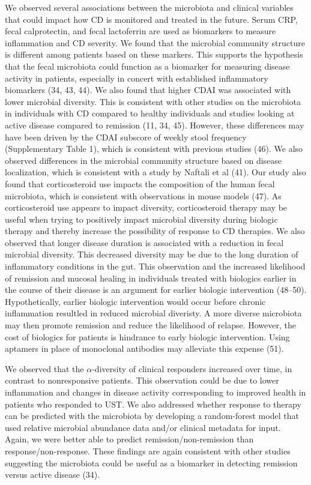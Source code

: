 \documentclass[11pt,]{article}
\begin{document}
We observed several associations between the microbiota and clinical
variables that could impact how CD is monitored and treated in the
future. Serum CRP, fecal calprotectin, and fecal lactoferrin are used as
biomarkers to measure inflammation and CD severity. We found that the
microbial community structure is different among patients based on these
markers. This supports the hypothesis that the fecal microbiota could
function as a biomarker for measuring disease activity in patients,
especially in concert with established inflammatory biomarkers (34, 43,
44). We also found that higher CDAI was associated with lower microbial
diversity. This is consistent with other studies on the microbiota in
individuals with CD compared to healthy individuals and studies looking
at active disease compared to remission (11, 34, 45). However, these
differences may have been driven by the CDAI subscore of weekly stool
frequency (Supplementary Table 1), which is consistent with previous
studies (46). We also observed differences in the microbial community
structure based on disease localization, which is consistent with a
study by Naftali et al (41). Our study also found that corticosteroid
use impacts the composition of the human fecal microbiota, which is
consistent with observations in mouse models (47). As corticosteroid use
appears to impact diversity, corticosteroid therapy may be useful when
trying to positively impact microbial diversity during biologic therapy
and thereby increase the possibility of response to CD therapies. We
also observed that longer disease duration is associated with a
reduction in fecal microbial diversity. This decreased diversity may be
due to the long duration of inflammatory conditions in the gut. This
observation and the increased likelihood of remission and mucosal
healing in individuals treated with biologics earlier in the course of
their disease is an argument for earlier biologic intervention (48--50).
Hypothetically, earlier biologic intervention would occur before chronic
inflammation resultled in reduced microbial diveristy. A more diverse
microbiota may then promote remission and reduce the likelihood of
relapse. However, the cost of biologics for patients is hindrance to
early biologic intervention. Using aptamers in place of monoclonal
antibodies may alleviate this expense (51).

We observed that the \({\alpha}\)-diversity of clinical responders
increased over time, in contrast to nonresponsive patients. This
observation could be due to lower inflammation and changes in disease
activity corresponding to improved health in patients who responded to
UST. We also addressed whether response to therapy can be predicted with
the microbiota by developing a random-forest model that used relative
microbial abundance data and/or clinical metadata for input. Again, we
were better able to predict remission/non-remission than
response/non-response. These findings are again consistent with other
studies suggesting the microbiota could be useful as a biomarker in
detecting remission versus active disease (34).
\end{document}
